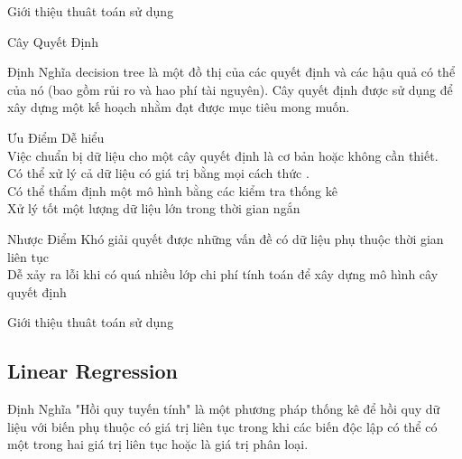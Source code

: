 \documentclass[10pt]{beamer}
\begin{document}
\begin{frame}{Giới thiệu thuât toán sử dụng}
    \begin{block}{Cây Quyết Định }
   
   \begin{block} {Định Nghĩa}
    decision tree là một đồ thị của các quyết định và các hậu quả có thể của nó (bao gồm rủi ro và hao phí tài nguyên). Cây quyết định được sử dụng để xây dựng một kế hoạch nhằm đạt được mục tiêu mong muốn.
   \end{block}
   
   \begin{minipage}{5cm}
        \begin{block}{Ưu Điểm}
        Dễ hiểu \\
        Việc chuẩn bị dữ liệu cho một cây quyết định là cơ bản hoặc không cần thiết.\\
        Có thể xử lý cả dữ liệu có giá trị bằng mọi cách thức .\\
        Có thể thẩm định một mô hình bằng các kiểm tra thống kê\\
        Xử lý tốt một lượng dữ liệu lớn trong thời gian ngắn
           
        \end{block}
   
   \end{minipage}
   \hfill
   \begin{minipage}{5cm}
        \begin{block}{Nhược Điểm}
           Khó giải quyết được những vấn đề có dữ liệu phụ thuộc thời gian liên tục\\
           Dễ xảy ra lỗi khi có quá nhiều lớp chi phí tính toán để xây dựng mô hình cây quyết định
        \end{block}
   \end{minipage}
   \end{block}
\end{frame}

\begin{frame}{Giới thiệu thuât toán sử dụng}
   \subsection{Linear Regression}
   \begin{block} {Định Nghĩa}
   "Hồi quy tuyến tính" là một phương pháp thống kê để hồi quy dữ liệu với biến phụ thuộc có giá trị liên tục trong khi các biến độc lập có thể có một trong hai giá trị liên tục hoặc là giá trị phân loại.
   \end{block}
   

\end{frame}
\end{document}
